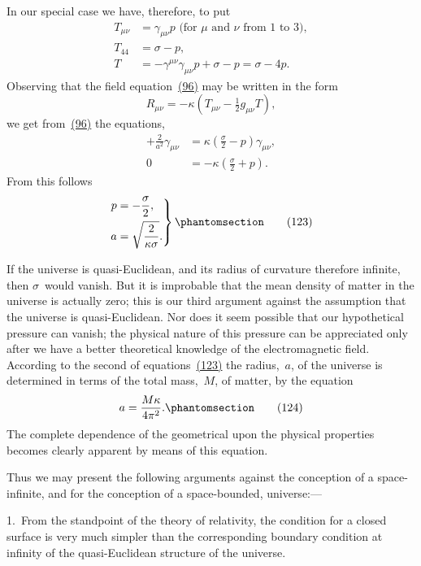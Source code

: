 \documentclass[12pt]{book}[2005/09/16]
\newcommand{\Change}[2]{#2}
\newcommand{\Add}[1]{\Change{}{#1}}
\newcommand{\PageSep}[1]{\ignorespaces}
\newcommand{\Tag}[1]{%
  \phantomsection
  \label{eqn:#1}
  \tag*{#1}
}
\newcommand{\Eqref}[1]{\hyperref[eqn:#1]{#1}}
\begin{document}
In our special case we have, therefore, to put
\begin{align*}
T_{\mu\nu}
  &= \gamma_{\mu\nu} p \text{ (for $\mu$~and~$\nu$ from~$1$ to~$3$)}\Add{,} \\
T_{44} &= \sigma - p\Add{,} \\
T &= -\gamma^{\mu\nu} \gamma_{\mu\nu} p + \sigma - p
  = \sigma - 4p.
\end{align*}
Observing that the field equation~\Eqref{(96)} may be written
in the form
\[
R_{\mu\nu} = -\kappa(T_{\mu\nu} - \tfrac{1}{2} g_{\mu\nu} T)\Add{,}
\]
we get from~\Eqref{(96)} the equations,
\begin{align*}
+\frac{2}{a^{2}} \gamma_{\mu\nu}
  &=  \kappa \left(\frac{\sigma}{2} - p\right) \gamma_{\mu\nu}\Add{,} \\
0 &= -\kappa \left(\frac{\sigma}{2} + p\right).
\end{align*}
\PageSep{118}
From this follows
\[
\left.
\begin{aligned}
p &= -\frac{\sigma}{2}\Add{,} \\
a &= \sqrt{\frac{2}{\kappa\sigma}}\Add{.}
\end{aligned}
\right\}
\Tag{(123)}
\]

If the universe is quasi-Euclidean, and its radius of
%
%
curvature therefore infinite, then $\sigma$~would vanish. But
it is improbable that the mean density of matter in the
universe is actually zero; this is our third argument
against the assumption that the universe is quasi-Euclidean.
Nor does it seem possible that our hypothetical
pressure can vanish; the physical nature of this
pressure can be appreciated only after we have a better
theoretical knowledge of the electromagnetic field.
According to the second of equations~\Eqref{(123)} the radius,~$a$,
of the universe is determined in terms of the total
mass,~$M$, of matter, by the equation
\[
a = \frac{M\kappa}{4\pi^{2}}\Add{.}
\Tag{(124)}
\]
The complete dependence of the geometrical upon the
physical properties becomes clearly apparent by means
of this equation.

Thus we may present the following arguments against
the conception of a space-infinite, and for the conception
of a space-bounded, universe:---

1.~From the standpoint of the theory of relativity,
the condition for a closed surface is very much simpler
than the corresponding boundary condition at infinity
of the quasi-Euclidean structure of the universe.
\PageSep{119}
\end{document}
